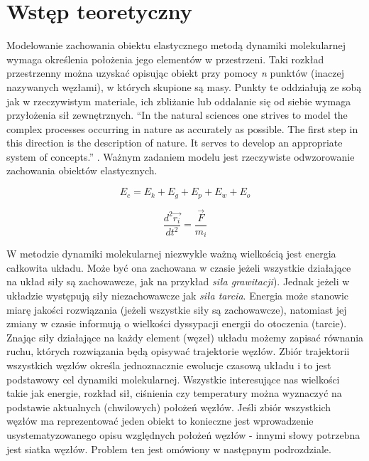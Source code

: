 \documentclass[12pt, letterpaper]{report}
\begin{document}
    
\chapter{Wstęp teoretyczny}

    Modelowanie zachowania obiektu elastycznego metodą dynamiki molekularnej wymaga określenia 
    położenia jego elementów w przestrzeni. Taki rozkład przestrzenny można uzyskać opisując 
    obiekt przy pomocy \emph{n} punktów (inaczej nazywanych węzłami), w 
    których skupione są masy. Punkty te oddziałują ze sobą jak w rzeczywistym materiale, ich 
    zbliżanie lub oddalanie się od siebie wymaga przyłożenia sił zewnętrznych.
    ``In the natural sciences one strives to model the complex 
        processes occurring in nature as accurately as possible. 
        The first step in this direction is the description of nature. 
        It serves to develop an appropriate system of concepts.'' \cite{moleculardynamics}. 
    Ważnym zadaniem modelu jest rzeczywiste odwzorowanie zachowania obiektów elastycznych.

    \begin{equation}
        E_{c} = E_{k} + E_{g} + E_{p} + E_{w} + E_{o}
    \end{equation}

    \begin{equation}
        \frac{d^{2} \vec{r_i}}{dt^{2}} = \frac{\vec{F}}{m_i}
    \end{equation}

    W metodzie dynamiki molekularnej niezwykle ważną wielkością jest energia całkowita układu.
    Może być ona zachowana w czasie jeżeli wszystkie działające 
    na układ siły są zachowawcze, jak na przykład \emph{siła grawitacji}). 
    Jednak jeżeli w układzie występują siły niezachowawcze jak \emph{siła tarcia}. 
    Energia może stanowic miarę jakości rozwiązania (jeżeli wszystkie siły są zachowawcze), 
    natomiast jej zmiany w czasie informują o wielkości dyssypacji energii do otoczenia (tarcie). \\

    Znając siły działające na każdy element (węzeł) układu możemy zapisać równania ruchu, 
    których rozwiązania będą opisywać trajektorie węzłów. 
    Zbiór trajektorii wszystkich węzłów określa jednoznacznie ewolucje czasową układu
    i to jest podstawowy cel dynamiki molekularnej. Wszystkie interesujące nas wielkości 
    takie jak energie, rozkład sił, ciśnienia czy temperatury można wyznaczyć 
    na podstawie aktualnych (chwilowych) położeń węzłów.
    Jeśli zbiór wszystkich węzłów ma reprezentować jeden obiekt to konieczne jest 
    wprowadzenie usystematyzowanego opisu względnych położeń węzłów - innymi słowy 
    potrzebna jest siatka węzłów. Problem ten jest omówiony w następnym podrozdziale.
\end{document}
